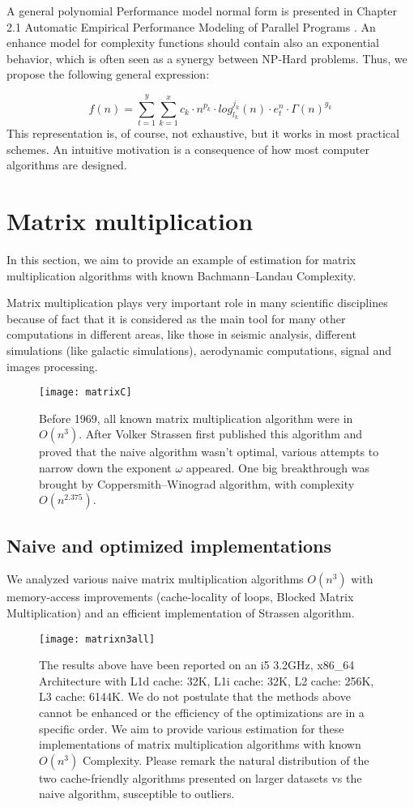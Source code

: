 A general polynomial Performance model normal form is presented in Chapter 2.1 Automatic Empirical Performance Modeling of Parallel Programs \cite{calotoiu2018automatic}. An enhance model for complexity functions should contain also an exponential behavior, which is often seen as a synergy between NP-Hard problems. Thus, we propose the following general expression:

\[ f(n) =\sum\limits_{t=1}^{y}  \sum\limits_{k=1}^{x} c_{k} \cdot n^{p_{k}} \cdot log_{l_{k}}^{j_{k}}(n) \cdot e_{t}^{n} \cdot  \Gamma(n)^{g_{k}} \]
This representation is, of course, not exhaustive, but it works in most practical schemes. An intuitive motivation is a consequence of how most computer algorithms are designed. \cite{calotoiu2018automatic}


\section{Matrix multiplication}
In this section, we aim to provide an example of estimation for matrix multiplication algorithms with known Bachmann–Landau Complexity.

Matrix multiplication plays very important role in many scientific disciplines because of fact that it is considered as the main tool for many other computations in different areas, like those in seismic analysis, different simulations (like galactic simulations), aerodynamic computations, signal and images processing. \cite{4588528}


\begin{figure}[H]
    \centering
    \texttt{[image: matrixC]}
    \caption{Before 1969, all known matrix multiplication algorithm were in $O(n^3)$. After Volker Strassen first published this algorithm and proved that the naive algorithm wasn't optimal, various attempts to narrow down the exponent $\omega$ appeared. One big breakthrough was brought by Coppersmith–Winograd algorithm, with complexity $O(n^{2.375})$. }
\end{figure}

\subsection{Naive and optimized implementations}
We analyzed various naive matrix multiplication algorithms $O(n^3)$ with memory-access improvements (cache-locality of loops, Blocked Matrix Multiplication) and an efficient implementation of Strassen algorithm.

\begin{figure}[H]
    \centering
    \texttt{[image: matrixn3all]}
    \caption{The results above have been reported on an i5 3.2GHz, x86\_64 Architecture with L1d cache: 32K, L1i cache: 32K, L2 cache: 256K, L3 cache: 6144K. We do not postulate that the methods above cannot be enhanced
    or the efficiency of the optimizations are in a specific order. We aim to provide various estimation for these implementations of matrix multiplication algorithms with known $O(n^3)$ Complexity. Please remark the natural distribution of the two cache-friendly algorithms presented on larger datasets vs the naive algorithm, susceptible to outliers.}
\end{figure}

